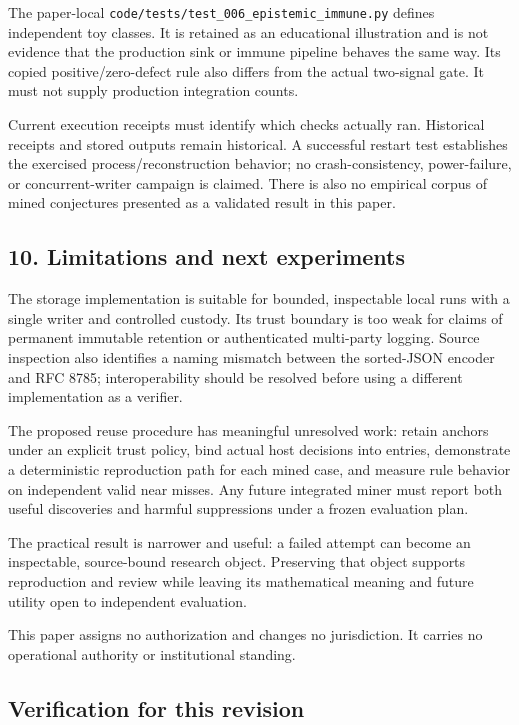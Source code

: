 \documentclass[
  11pt,
]{article}
\begin{document}
The paper-local
\texttt{\nolinkurl{code/tests/test_006_epistemic_immune.py}}
defines independent toy classes. It is retained as an educational
illustration and is not evidence that the production sink or immune
pipeline behaves the same way. Its copied positive/zero-defect rule also
differs from the actual two-signal gate. It must not supply production
integration counts.

Current execution receipts must identify which checks actually ran.
Historical receipts and stored outputs remain historical. A successful
restart test establishes the exercised process/reconstruction behavior;
no crash-consistency, power-failure, or concurrent-writer campaign is
claimed. There is also no empirical corpus of mined conjectures
presented as a validated result in this paper.

\hypertarget{limitations-and-next-experiments}{%
\subsection{10. Limitations and next
experiments}\label{limitations-and-next-experiments}}

The storage implementation is suitable for bounded, inspectable local
runs with a single writer and controlled custody. Its trust boundary is
too weak for claims of permanent immutable retention or authenticated
multi-party logging. Source inspection also identifies a naming mismatch
between the sorted-JSON encoder and RFC 8785; interoperability should be
resolved before using a different implementation as a verifier.

The proposed reuse procedure has meaningful unresolved work: retain
anchors under an explicit trust policy, bind actual host decisions into
entries, demonstrate a deterministic reproduction path for each mined
case, and measure rule behavior on independent valid near misses. Any
future integrated miner must report both useful discoveries and harmful
suppressions under a frozen evaluation plan.

The practical result is narrower and useful: a failed attempt can become
an inspectable, source-bound research object. Preserving that object
supports reproduction and review while leaving its mathematical meaning
and future utility open to independent evaluation.

This paper assigns no authorization and changes no jurisdiction. It
carries no operational authority or institutional standing.

\hypertarget{verification-for-this-revision}{%
\subsection{Verification for this
revision}\label{verification-for-this-revision}}
\end{document}
